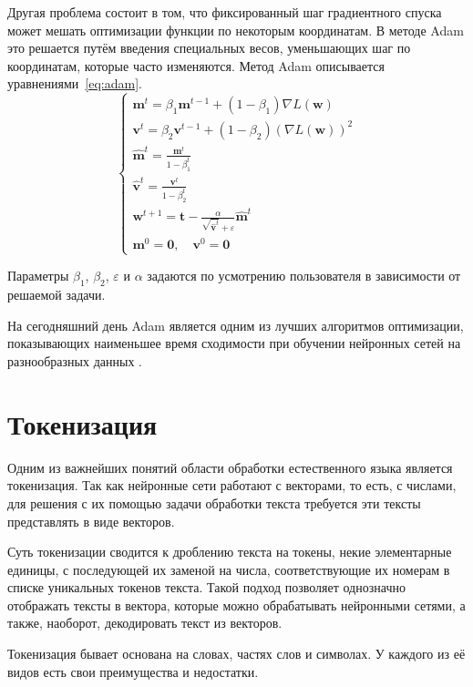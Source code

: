 Другая проблема состоит в том, что фиксированный шаг градиентного спуска может мешать оптимизации функции по некоторым координатам. В методе Adam это решается путём введения специальных весов, уменьшающих шаг по координатам, которые часто изменяются. Метод Adam описывается уравнениями \ref*{eq:adam}.
\begin{equation}
    \label{eq:adam}
    \begin{cases}
        \mathbf{m}^t=\beta_1\mathbf{m}^{t-1}+(1-\beta_1)\nabla L(\mathbf{w}) \\
        \mathbf{v}^t=\beta_2\mathbf{v}^{t-1}+(1-\beta_2)(\nabla L(\mathbf{w}))^2 \\
        \hat{\mathbf{m}}^t=\frac{\mathbf{m}^t}{1-\beta_1^t} \\
        \hat{\mathbf{v}}^t=\frac{\mathbf{v}^t}{1-\beta_2^t} \\
        \mathbf{w}^{t+1}=\mathbf{t}-\frac{\alpha}{\sqrt{\hat{\mathbf{v}}^t}+\varepsilon}\hat{\mathbf{m}}^t \\
        \mathbf{m}^0=\mathbf{0},\quad\mathbf{v}^0=\mathbf{0}
    \end{cases}
\end{equation}

Параметры $\beta_1$, $\beta_2$, $\varepsilon$ и $\alpha$ задаются по усмотрению пользователя в зависимости от решаемой задачи.

На сегодняшний день Adam является одним из лучших алгоритмов оптимизации, показывающих наименьшее время сходимости при обучении нейронных сетей на разнообразных данных \cite{art:optimizers}.

\section{Токенизация}

Одним из важнейших понятий области обработки естественного языка является токенизация. Так как нейронные сети работают с векторами, то есть, с числами, для решения с их помощью задачи обработки текста требуется эти тексты представлять в виде векторов.

Суть токенизации сводится к дроблению текста на токены, некие элементарные единицы, с последующей их заменой на числа, соответствующие их номерам в списке уникальных токенов текста. Такой подход позволяет однозначно отображать тексты в вектора, которые можно обрабатывать нейронными сетями, а также, наоборот, декодировать текст из векторов.

Токенизация бывает основана на словах, частях слов и символах. У каждого из её видов есть свои преимущества и недостатки.

